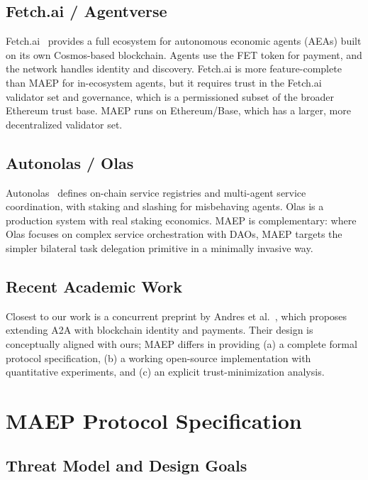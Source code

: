 \documentclass[conference]{IEEEtran}
\begin{document}
\subsection{Fetch.ai / Agentverse}

Fetch.ai~\cite{fetchai} provides a full ecosystem for autonomous
economic agents (AEAs) built on its own Cosmos-based blockchain.
Agents use the FET token for payment, and the network handles identity
and discovery.  Fetch.ai is more feature-complete than MAEP for
in-ecosystem agents, but it requires trust in the Fetch.ai validator
set and governance, which is a permissioned subset of the broader
Ethereum trust base.  MAEP runs on Ethereum/Base, which has a larger,
more decentralized validator set.

\subsection{Autonolas / Olas}

Autonolas~\cite{autonolas} defines on-chain service registries and
multi-agent service coordination, with staking and slashing for
misbehaving agents.  Olas is a production system with real staking
economics.  MAEP is complementary: where Olas focuses on complex
service orchestration with DAOs, MAEP targets the simpler bilateral
task delegation primitive in a minimally invasive way.

\subsection{Recent Academic Work}

Closest to our work is a concurrent preprint by Andres et
al.~\cite{andres2025}, which proposes extending A2A with blockchain
identity and payments.  Their design is conceptually aligned with
ours; MAEP differs in providing (a) a complete formal protocol
specification, (b) a working open-source implementation with
quantitative experiments, and (c) an explicit trust-minimization
analysis.

\section{MAEP Protocol Specification}
\label{sec:protocol}

\subsection{Threat Model and Design Goals}
\end{document}
